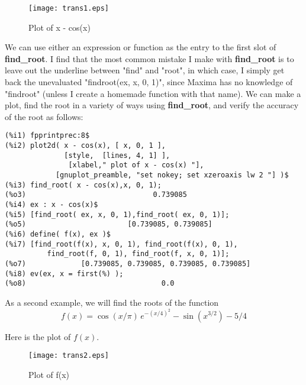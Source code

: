 \documentclass[12pt]{article}
\begin{document}
\smallskip
\begin{figure} [h]
   \centerline{\texttt{[image: trans1.eps]} }
	\caption{Plot of x - cos(x)}
\end{figure}

We can use either an expression or function as the entry to the first slot
  of \textbf{find\_root}.
I find that the most common mistake I make with \textbf{find\_root} is to
  leave out the underline between "find" and "root", in which case, I
  simply get back the unevaluated "findroot(ex, x, 0, 1)", since Maxima
  has no knowledge of "findroot" (unless I create a homemade function with
  that name).
\newpage
We can make a plot, find the root in a variety of ways using \textbf{find\_root},
   and verify the accuracy of the root as follows:  
\small
\begin{verbatim}
(%i1) fpprintprec:8$
(%i2) plot2d( x - cos(x), [ x, 0, 1 ],
              [style,  [lines, 4, 1] ],
               [xlabel," plot of x - cos(x) "],
            [gnuplot_preamble, "set nokey; set xzeroaxis lw 2 "] )$
(%i3) find_root( x - cos(x),x, 0, 1);
(%o3)                              0.739085
(%i4) ex : x - cos(x)$
(%i5) [find_root( ex, x, 0, 1),find_root( ex, 0, 1)];
(%o5)                        [0.739085, 0.739085]
(%i6) define( f(x), ex )$ 
(%i7) [find_root(f(x), x, 0, 1), find_root(f(x), 0, 1),
          find_root(f, 0, 1), find_root(f, x, 0, 1)];
(%o7)             [0.739085, 0.739085, 0.739085, 0.739085]
(%i8) ev(ex, x = first(%) );
(%o8)                                0.0
\end{verbatim}
\normalsize
%

\smallskip
As a second example, we will find the roots of the function
$$ f(x) = \cos(x/\pi) \, e^{-(x/4)^{2}} - \sin(x^{3/2}) - 5/4 $$

Here is the plot of $f(x)$.

  \smallskip
\begin{figure} [h]
   \centerline{\texttt{[image: trans2.eps]} }
	\caption{Plot of f(x)}
\end{figure}
\end{document}
